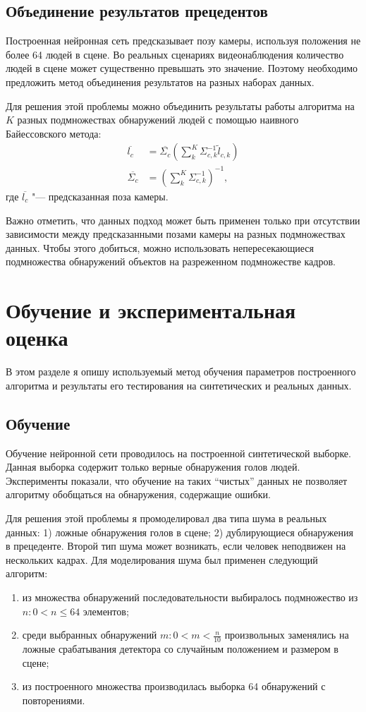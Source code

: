 \subsection{Объединение результатов прецедентов}

Построенная нейронная сеть предсказывает позу камеры, используя положения не более 64 людей в сцене. Во реальных сценариях видеонаблюдения количество людей в сцене может существенно превышать это значение. Поэтому необходимо предложить метод объединения результатов на разных наборах данных.

Для решения этой проблемы можно объединить результаты работы алгоритма на $K$ разных подмножествах обнаружений людей с помощью наивного Байессовского метода:
\begin{align}
	\overline{l_c} &= \overline{\Sigma_c} \left( \sum_k^K{\Sigma_{c,k}^{-1} \tilde{l}_{c,k} } \right) \\
	\overline{\Sigma_c} &= \left( \sum_k^K \Sigma_{c,k}^{-1} \right) ^ {-1},
\end{align}
где $\overline{l_c}$ "--- предсказанная поза камеры.

Важно отметить, что данных подход может быть применен только при отсутствии зависимости между предсказанными позами камеры на разных подмножествах данных. Чтобы этого добиться, можно использовать непересекающиеся подмножества обнаружений объектов на разреженном подмножестве кадров.

\section{Обучение и экспериментальная оценка}

В этом разделе я опишу используемый метод обучения параметров построенного алгоритма и результаты его тестирования на синтетических и реальных данных.

\subsection{Обучение}

Обучение нейронной сети проводилось на построенной синтетической выборке. Данная выборка содержит только верные обнаружения голов людей. Эксперименты показали, что обучение на таких ``чистых'' данных не позволяет алгоритму обобщаться на обнаружения, содержащие ошибки.

Для решения этой проблемы я промоделировал два типа шума в реальных данных: 1) ложные обнаружения голов в сцене; 2) дублирующиеся обнаружения в прецеденте. Второй тип шума может возникать, если человек неподвижен на нескольких кадрах. Для моделирования шума был применен следующий алгоритм:
\begin{enumerate}
	\item из множества обнаружений последовательности выбиралось подмножество из $n: 0 < n \le 64$ элементов;
	\item среди выбранных обнаружений $m: 0 < m < \frac{n}{10}$ произвольных заменялись на ложные срабатывания детектора со случайным положением и размером в сцене;
	\item из построенного множества производилась выборка 64 обнаружений с повторениями.
\end{enumerate}

